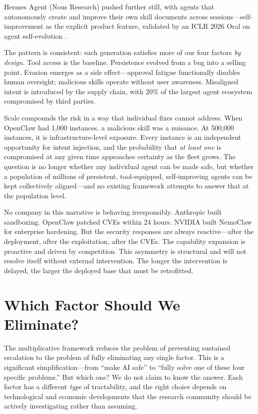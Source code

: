 \documentclass[10pt]{article}
\begin{document}
Hermes Agent (Nous Research) pushed further still, with agents that autonomously create and improve their own skill documents across sessions---self-improvement as the explicit product feature, validated by an ICLR 2026 Oral on agent self-evolution \citep{hermesagent2026,hermesevolution2026}.

The pattern is consistent: each generation satisfies more of our four factors \emph{by design}. Tool access is the baseline. Persistence evolved from a bug into a selling point. Evasion emerges as a side effect---approval fatigue functionally disables human oversight; malicious skills operate without user awareness. Misaligned intent is introduced by the supply chain, with 20\% of the largest agent ecosystem compromised by third parties.

Scale compounds the risk in a way that individual fixes cannot address. When OpenClaw had 1,000 instances, a malicious skill was a nuisance. At 500,000 instances, it is infrastructure-level exposure. Every instance is an independent opportunity for intent injection, and the probability that \emph{at least one} is compromised at any given time approaches certainty as the fleet grows. The question is no longer whether any individual agent can be made safe, but whether a population of millions of persistent, tool-equipped, self-improving agents can be kept collectively aligned---and no existing framework attempts to answer that at the population level.

No company in this narrative is behaving irresponsibly. Anthropic built sandboxing. OpenClaw patched CVEs within 24 hours. NVIDIA built NemoClaw for enterprise hardening. But the security responses are always reactive---after the deployment, after the exploitation, after the CVEs. The capability expansion is proactive and driven by competition. This asymmetry is structural and will not resolve itself without external intervention. The longer the intervention is delayed, the larger the deployed base that must be retrofitted.


\section{Which Factor Should We Eliminate?}

The multiplicative framework reduces the problem of preventing sustained escalation to the problem of fully eliminating any single factor. This is a significant simplification---from ``make AI safe'' to ``fully solve one of these four specific problems.'' But which one? We do not claim to know the answer. Each factor has a different \emph{type} of tractability, and the right choice depends on technological and economic developments that the research community should be actively investigating rather than assuming.
\end{document}
